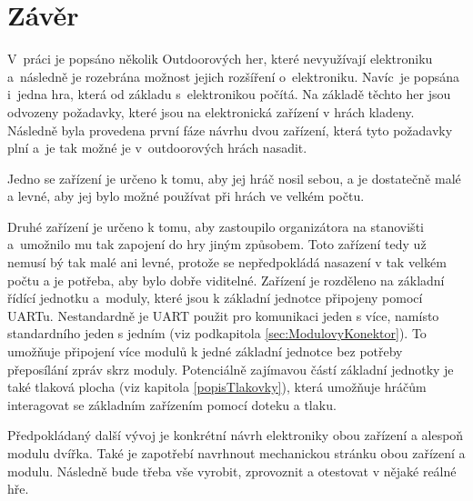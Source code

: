 \chapter*{Závěr}
{}

V~práci je popsáno několik Outdoorových her, které nevyužívají elektroniku a~následně je rozebrána možnost jejich rozšíření o~elektroniku.
Navíc~je popsána i~jedna hra, která od základu s~elektronikou počítá.
Na základě těchto her jsou odvozeny požadavky, které jsou na elektronická zařízení v hrách kladeny.
Následně byla provedena první fáze návrhu dvou zařízení, která tyto požadavky plní a~je tak možné je v~outdoorových hrách nasadit.

Jedno se zařízení je určeno k tomu, aby jej hráč nosil sebou, a je dostatečně malé a levné, aby jej bylo možné používat při hrách ve velkém počtu.

Druhé zařízení je určeno k tomu, aby zastoupilo organizátora na stanovišti a~umožnilo mu tak zapojení do hry jiným způsobem.
Toto zařízení tedy už nemusí bý tak malé ani levné, protože se nepředpokládá nasazení v tak velkém počtu a je potřeba, aby bylo dobře viditelné.
Zařízení je rozděleno na základní řídící jednotku a~moduly, které jsou k základní jednotce připojeny pomocí UARTu.
Nestandardně je UART použit pro komunikaci jeden s více, namísto standardního jeden s jedním (viz podkapitola \ref{sec:ModulovyKonektor}).
To umožňuje připojení více modulů k jedné základní jednotce bez potřeby přeposílání zpráv skrz moduly.
Potenciálně zajímavou částí základní jednotky je také tlaková plocha (viz kapitola \ref{popisTlakovky}), která umožňuje hráčům interagovat se základním zařízením pomocí doteku a tlaku.

Předpokládaný další vývoj je konkrétní návrh elektroniky obou zařízení a alespoň modulu dvířka.
Také je zapotřebí navrhnout mechanickou stránku obou zařízení a modulu.
Následně bude třeba vše vyrobit, zprovoznit a otestovat v nějaké reálné hře.
